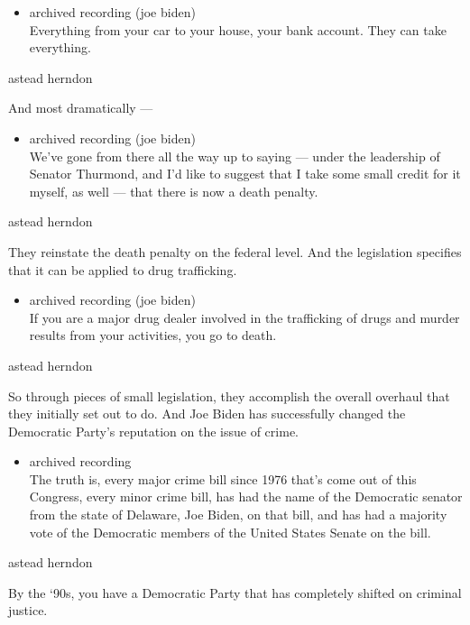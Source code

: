 \begin{itemize}
\tightlist
\item
  archived recording (joe biden)\\
  Everything from your car to your house, your bank account. They can
  take everything.
\end{itemize}

astead herndon

And most dramatically ---

\begin{itemize}
\tightlist
\item
  archived recording (joe biden)\\
  We've gone from there all the way up to saying --- under the
  leadership of Senator Thurmond, and I'd like to suggest that I take
  some small credit for it myself, as well --- that there is now a death
  penalty.
\end{itemize}

astead herndon

They reinstate the death penalty on the federal level. And the
legislation specifies that it can be applied to drug trafficking.

\begin{itemize}
\tightlist
\item
  archived recording (joe biden)\\
  If you are a major drug dealer involved in the trafficking of drugs
  and murder results from your activities, you go to death.
\end{itemize}

astead herndon

So through pieces of small legislation, they accomplish the overall
overhaul that they initially set out to do. And Joe Biden has
successfully changed the Democratic Party's reputation on the issue of
crime.

\begin{itemize}
\tightlist
\item
  archived recording\\
  The truth is, every major crime bill since 1976 that's come out of
  this Congress, every minor crime bill, has had the name of the
  Democratic senator from the state of Delaware, Joe Biden, on that
  bill, and has had a majority vote of the Democratic members of the
  United States Senate on the bill.
\end{itemize}

astead herndon

By the `90s, you have a Democratic Party that has completely shifted on
criminal justice.

